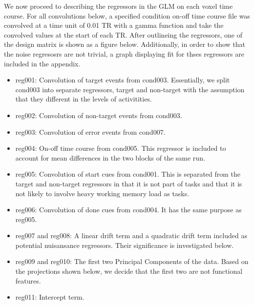 \documentclass[11pt]{article}
\begin{document}
We now proceed to describing the regressors in the GLM on each voxel time
course. For all convolutions below, a specified condition on-off time course 
file was convolved at a time unit of 0.01 TR with a gamma function and take the
convolved values at the start of each TR. After outlineing the regressors, one 
of the design matrix is shown as a figure below. Additionally, in order to show
that the noise regresosrs are not trivial, a graph displaying fit for thses regressors 
are included in the appendix. 

\begin{itemize}
\item reg001: Convolution of target events from cond003. Essentially, we split cond003
into separate regressors, target and non-target with the assumption that they
different in the levels of activitities.

\item reg002: Convolution of non-target events from cond003.

\item reg003: Convolution of error events from cond007.

\item reg004: On-off time course from cond005. This regressor is included to account
for mean differences in the two blocks of the same run.

\item reg005: Convolution of start cues from cond001. This is separated from the
target and non-target regressors in that it is not part of tasks and that it is
not likely to involve heavy working memory load as tasks.

\item reg006: Convolution of done cues from cond004. It has the same purpose as
reg005.

\item reg007 and reg008: A linear drift term and a quadratic drift term included as
potential nuisansance regressors. Their significance is investigated below.

\item reg009 and reg010: The first two Principal Components of the data. Based on the
projections shown below, we decide that the first two are not functional
features.

\item reg011: Intercept term.

\end{itemize}
\end{document}
